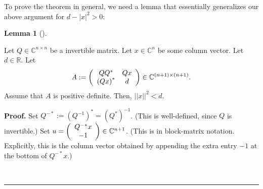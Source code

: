 \documentclass[numbers=enddot,12pt,final,onecolumn,notitlepage]{scrartcl}%
\numberwithin{exer}{subsection}
\theoremstyle{definition}
\newtheorem{lem}[theo]{Lemma}
\newenvironment{lemma}[1][]
{\begin{lem}[#1]\begin{leftbar}}
{\end{leftbar}\end{lem}}
\newenvironment{proof}[1][Proof]{\noindent\textbf{#1.} }{\ \rule{0.5em}{0.5em}}
\begin{document}
To prove the theorem in general, we need a lemma that essentially generalizes
our above argument for $d-\left\vert x\right\vert ^{2}>0$:

\begin{lemma}
Let $Q\in\mathbb{C}^{n\times n}$ be a invertible matrix. Let $x\in
\mathbb{C}^{n}$ be some column vector. Let $d\in\mathbb{R}$. Let%
\[
A:=\left(
\begin{array}
[c]{cc}%
QQ^{\ast} & Qx\\
\left(  Qx\right)  ^{\ast} & d
\end{array}
\right)  \in\mathbb{C}^{\left(  n+1\right)  \times\left(  n+1\right)  }.
\]
Assume that $A$ is positive definite. Then, $\left\vert \left\vert
x\right\vert \right\vert ^{2}<d$.
\end{lemma}

\begin{proof}
Set $Q^{-\ast}:=\left(  Q^{-1}\right)  ^{\ast}=\left(  Q^{\ast}\right)  ^{-1}%
$. (This is well-defined, since $Q$ is invertible.) Set $u=\left(
\begin{array}
[c]{c}%
Q^{-\ast}x\\
-1
\end{array}
\right)  \in\mathbb{C}^{n+1}$. (This is in block-matrix notation. Explicitly,
this is the column vector obtained by appending the extra entry $-1$ at the
bottom of $Q^{-\ast}x$.)


\end{proof}
\end{document}

